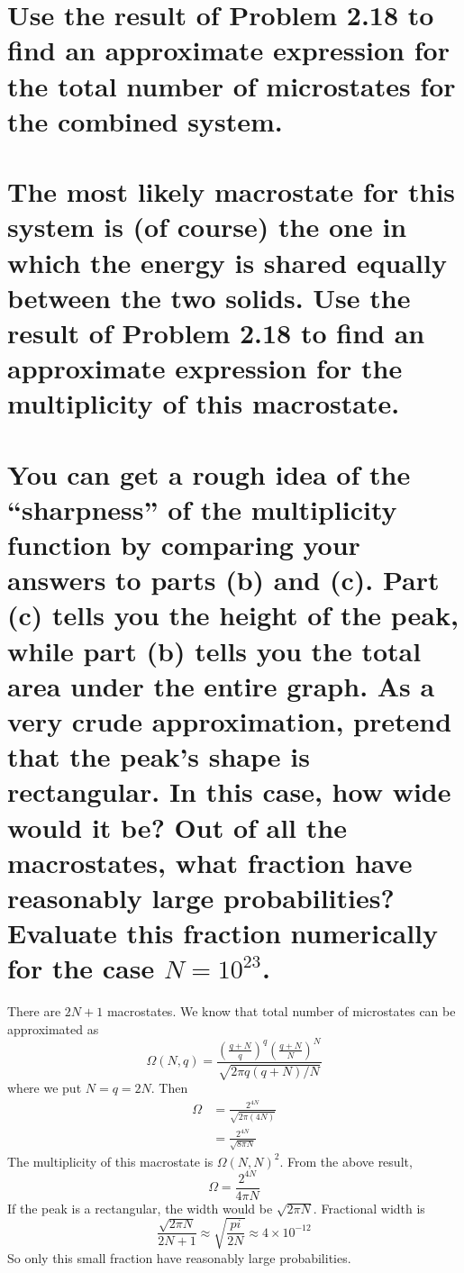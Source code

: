 \documentclass[answers]{exam}
\begin{document}
\begin{questions}
\begin{parts}
    \part{Use the result of Problem 2.18 to find an approximate expression for the total number of microstates for the combined system.}
    \part{The most likely macrostate for this system is (of course) the one in which the energy is shared equally between the two solids. Use the result of Problem 2.18 to find an approximate expression for the multiplicity of this macrostate.}
    \part{You can get a rough idea of the “sharpness” of the multiplicity function by comparing your answers to parts (b) and (c). Part (c) tells you the height of the peak, while part (b) tells you the total area under the entire graph. As a very crude approximation, pretend that the peak’s shape is rectangular. In this case, how wide would it be? Out of all the macrostates, what fraction have reasonably large probabilities? Evaluate this fraction numerically for the case $N=10^{23}$.}
\end{parts}

\begin{solution}
    There are $2N+1$ macrostates. We know that total number of microstates can be approximated as
    $$\Omega(N,q) = \frac{\left(\frac{q+N}{q}\right)^q\left(\frac{q+N}{N}\right)^N}{\sqrt{2\pi q(q+N)/N}}$$
    where we put $N=q=2N$. Then
    \begin{align*}
        \Omega &= \frac{2^{4N}}{\sqrt{2\pi(4N)}} \\
               &= \frac{2^{4N}}{\sqrt{8\pi N}}
    \end{align*}
    The multiplicity of this macrostate is $\Omega(N,N)^2$. From the above result,
    $$\Omega = \frac{2^{4N}}{4\pi N}$$
    If the peak is a rectangular, the width would be $\sqrt{2\pi N}$. Fractional width is
    $$\frac{\sqrt{2\pi N}}{2N+1} \approx \sqrt{\frac{pi}{2N}} \approx 4\times10^{-12}$$
    So only this small fraction have reasonably large probabilities.
\end{solution}



\end{questions}
\end{document}
